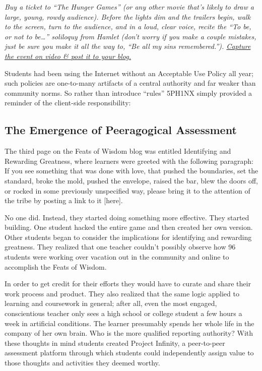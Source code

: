 \emph{Buy a ticket to ``The Hunger Games'' (or any other movie that's
likely to draw a large, young, rowdy audience). Before the lights dim
and the trailers begin, walk to the screen, turn to the audience, and in
a loud, clear voice, recite the ``To be, or not to be\ldots{}''
soliloquy from Hamlet (don't worry if you make a couple mistakes, just
be sure you make it all the way to, ``Be all my sins remembered.'').
\href{http://alarhsenglitcomp.blogspot.com/2012/12/feats-of-wisdom-1\_15.html}{Capture
the event on video \& post it to your blog.}} 

Students had been using the Internet without an Acceptable Use Policy
all year; such policies are one-to-many artifacts of a central
authority and far weaker than community norms. So rather than
introduce ``rules'' 5PH1NX simply provided a reminder of the
client-side responsibility:

\subsection{The Emergence of Peeragogical Assessment}

The third page on the Feats of Wisdom blog was entitled Identifying and
Rewarding Greatness, where learners were greeted with the following
paragraph: If you see something that was done with love, that pushed the
boundaries, set the standard, broke the mold, pushed the envelope,
raised the bar, blew the doors off, or rocked in some previously
unspecified way, please bring it to the attention of the tribe by
posting a link to it {[}here{]}. 

No one did. Instead, they started doing something more effective. They
started building. One student hacked the entire game and then created
her own version. Other students began to consider the implications for
identifying and rewarding greatness. They realized that one teacher
couldn't possibly observe how 96 students were working over vacation
out in the community and online to accomplish the Feats of Wisdom.

In order to get credit for their efforts they would have to curate and
share their work process and product. They also realized that the same
logic applied to learning and coursework in general; after all, even
the most engaged, conscientious teacher only sees a high school or
college student a few hours a week in artificial conditions. The
learner presumably spends her whole life in the company of her own
brain. Who is the more qualified reporting authority? With these
thoughts in mind students created Project Infinity, a peer-to-peer
assessment platform through which students could independently assign
value to those thoughts and activities they deemed worthy. 

